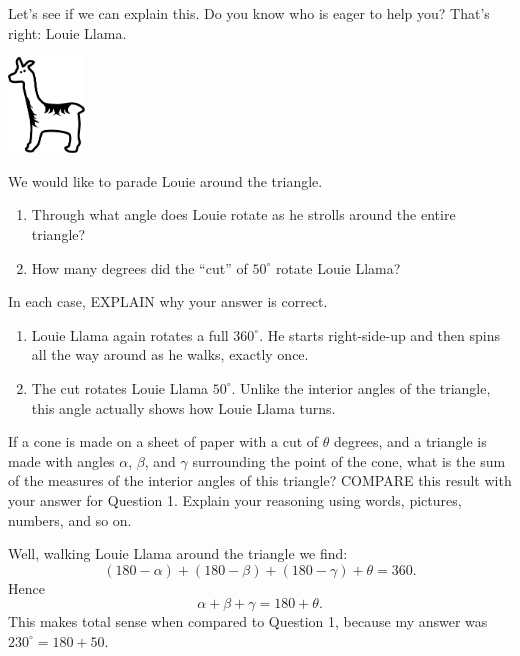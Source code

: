 \documentclass[nooutcomes,noauthor,handout]{ximera}
\begin{document}
\begin{question}
  Let's see if we can explain this. Do you know who is eager to help
you? That's right: Louie Llama.
\begin{center}
\includegraphics[height=1in]{llama.pdf}
\end{center}

We would like to parade Louie around the triangle.
\begin{enumerate}
\item Through what angle does Louie rotate as he strolls around the
  entire triangle?
\item How many degrees did the ``cut'' of $50^\circ$ rotate Louie
  Llama?
\end{enumerate}
In each case, EXPLAIN why your answer is correct. 
\begin{freeResponse}
  \begin{enumerate}
  \item Louie Llama again rotates a full $360^\circ$. He starts
    right-side-up and then spins all the way around as he walks,
    exactly once.
  \item The cut rotates Louie Llama $50^\circ$. Unlike the interior
    angles of the triangle, this angle actually shows how Louie Llama
    turns.
  \end{enumerate}
\end{freeResponse}
\end{question}

\mynewpage


\begin{question}
If a cone is made on a sheet of paper with a cut of $\theta$ degrees,
and a triangle is made with angles $\alpha$, $\beta$, and $\gamma$
surrounding the point of the cone, what is the sum of the measures of
the interior angles of this triangle? COMPARE this result with your
answer for Question 1. Explain your reasoning using words, pictures,
numbers, and so on.
\begin{freeResponse}
  Well, walking Louie Llama around the triangle we find:
  \[
  (180-\alpha) + (180-\beta) + (180-\gamma) + \theta = 360.
  \]
  Hence
  \[
  \alpha + \beta + \gamma = 180 + \theta.
  \]
  This makes total sense when compared to Question 1, because my
  answer was $230^\circ = 180+50$.
\end{freeResponse}
\end{question}
\end{document}
